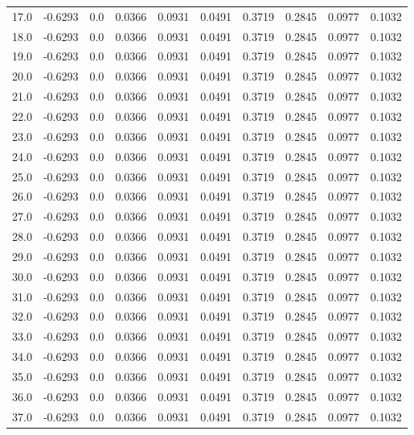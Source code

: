 \begin{longtable}{lrrrrrrrrr}
17.0 & -0.6293 & 0.0 & 0.0366 & 0.0931 & 0.0491 & 0.3719 & 0.2845 & 0.0977 & 0.1032 \\
18.0 & -0.6293 & 0.0 & 0.0366 & 0.0931 & 0.0491 & 0.3719 & 0.2845 & 0.0977 & 0.1032 \\
19.0 & -0.6293 & 0.0 & 0.0366 & 0.0931 & 0.0491 & 0.3719 & 0.2845 & 0.0977 & 0.1032 \\
20.0 & -0.6293 & 0.0 & 0.0366 & 0.0931 & 0.0491 & 0.3719 & 0.2845 & 0.0977 & 0.1032 \\
21.0 & -0.6293 & 0.0 & 0.0366 & 0.0931 & 0.0491 & 0.3719 & 0.2845 & 0.0977 & 0.1032 \\
22.0 & -0.6293 & 0.0 & 0.0366 & 0.0931 & 0.0491 & 0.3719 & 0.2845 & 0.0977 & 0.1032 \\
23.0 & -0.6293 & 0.0 & 0.0366 & 0.0931 & 0.0491 & 0.3719 & 0.2845 & 0.0977 & 0.1032 \\
24.0 & -0.6293 & 0.0 & 0.0366 & 0.0931 & 0.0491 & 0.3719 & 0.2845 & 0.0977 & 0.1032 \\
25.0 & -0.6293 & 0.0 & 0.0366 & 0.0931 & 0.0491 & 0.3719 & 0.2845 & 0.0977 & 0.1032 \\
26.0 & -0.6293 & 0.0 & 0.0366 & 0.0931 & 0.0491 & 0.3719 & 0.2845 & 0.0977 & 0.1032 \\
27.0 & -0.6293 & 0.0 & 0.0366 & 0.0931 & 0.0491 & 0.3719 & 0.2845 & 0.0977 & 0.1032 \\
28.0 & -0.6293 & 0.0 & 0.0366 & 0.0931 & 0.0491 & 0.3719 & 0.2845 & 0.0977 & 0.1032 \\
29.0 & -0.6293 & 0.0 & 0.0366 & 0.0931 & 0.0491 & 0.3719 & 0.2845 & 0.0977 & 0.1032 \\
30.0 & -0.6293 & 0.0 & 0.0366 & 0.0931 & 0.0491 & 0.3719 & 0.2845 & 0.0977 & 0.1032 \\
31.0 & -0.6293 & 0.0 & 0.0366 & 0.0931 & 0.0491 & 0.3719 & 0.2845 & 0.0977 & 0.1032 \\
32.0 & -0.6293 & 0.0 & 0.0366 & 0.0931 & 0.0491 & 0.3719 & 0.2845 & 0.0977 & 0.1032 \\
33.0 & -0.6293 & 0.0 & 0.0366 & 0.0931 & 0.0491 & 0.3719 & 0.2845 & 0.0977 & 0.1032 \\
34.0 & -0.6293 & 0.0 & 0.0366 & 0.0931 & 0.0491 & 0.3719 & 0.2845 & 0.0977 & 0.1032 \\
35.0 & -0.6293 & 0.0 & 0.0366 & 0.0931 & 0.0491 & 0.3719 & 0.2845 & 0.0977 & 0.1032 \\
36.0 & -0.6293 & 0.0 & 0.0366 & 0.0931 & 0.0491 & 0.3719 & 0.2845 & 0.0977 & 0.1032 \\
37.0 & -0.6293 & 0.0 & 0.0366 & 0.0931 & 0.0491 & 0.3719 & 0.2845 & 0.0977 & 0.1032 \\

\end{longtable}

